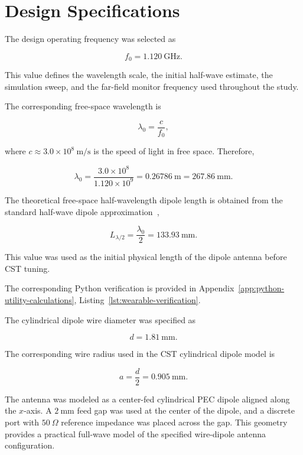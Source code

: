 \section{Design Specifications}


The design operating frequency was selected as

\[
f_0 = 1.120~\mathrm{GHz}.
\]

This value defines the wavelength scale, the initial half-wave estimate, the simulation sweep, and the far-field monitor frequency used throughout the study.

The corresponding free-space wavelength is

\[
\lambda_0 = \frac{c}{f_0},
\]

where \(c \approx 3.0 \times 10^8~\mathrm{m/s}\) is the speed of light in free space. Therefore,

\[
\lambda_0 =
\frac{3.0 \times 10^8}{1.120 \times 10^9}
=
0.26786~\mathrm{m}
=
267.86~\mathrm{mm}.
\]

The theoretical free-space half-wavelength dipole length is obtained from the standard half-wave dipole approximation~\cite{stutzman2012antenna},

\[
L_{\lambda/2} = \frac{\lambda_0}{2}
=
133.93~\mathrm{mm}.
\]

This value was used as the initial physical length of the dipole antenna before CST tuning.

The corresponding Python verification is provided in Appendix~\ref{app:python-utility-calculations}, Listing~\ref{lst:wearable-verification}.


The cylindrical dipole wire diameter was specified as

\[
d = 1.81~\mathrm{mm}.
\]

The corresponding wire radius used in the CST cylindrical dipole model is

\[
a = \frac{d}{2}
=
0.905~\mathrm{mm}.
\]

The antenna was modeled as a center-fed cylindrical PEC dipole aligned along the \(x\)-axis. A \(2~\mathrm{mm}\) feed gap was used at the center of the dipole, and a discrete port with \(50~\Omega\) reference impedance was placed across the gap. This geometry provides a practical full-wave model of the specified wire-dipole antenna configuration.

